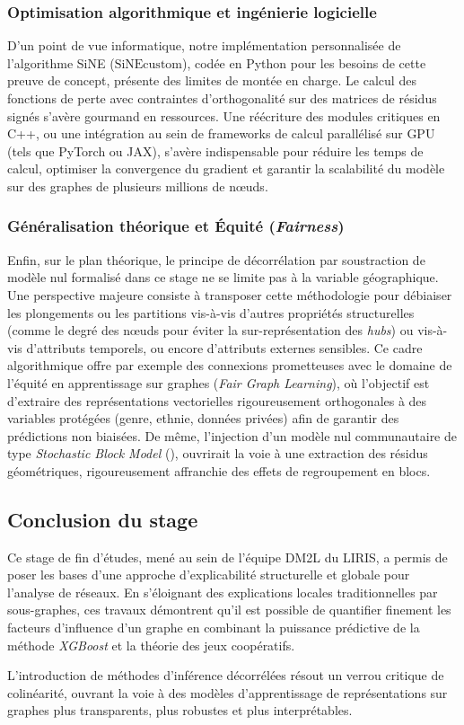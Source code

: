 \subsubsection{Optimisation algorithmique et ingénierie logicielle}
D'un point de vue informatique, notre implémentation personnalisée de l'algorithme SiNE ($\text{SiNEcustom}$), codée en Python pour les besoins de cette preuve de concept, présente des limites de montée en charge. Le calcul des fonctions de perte avec contraintes d'orthogonalité sur des matrices de résidus signés s'avère gourmand en ressources. 
Une réécriture des modules critiques en C++, ou une intégration au sein de frameworks de calcul parallélisé sur GPU (tels que PyTorch ou JAX), s'avère indispensable pour réduire les temps de calcul, optimiser la convergence du gradient et garantir la scalabilité du modèle sur des graphes de plusieurs millions de nœuds.

\subsubsection{Généralisation théorique et Équité (\textit{Fairness})}
Enfin, sur le plan théorique, le principe de décorrélation par soustraction de modèle nul formalisé dans ce stage ne se limite pas à la variable géographique. Une perspective majeure consiste à transposer cette méthodologie pour débiaiser les plongements ou les partitions vis-à-vis d'autres propriétés structurelles (comme le degré des nœuds pour éviter la sur-représentation des \textit{hubs}) ou vis-à-vis d'attributs temporels, ou encore d'attributs externes sensibles. Ce cadre algorithmique offre par exemple des connexions prometteuses avec le domaine de l'équité en apprentissage sur graphes (\textit{Fair Graph Learning}), où l'objectif est d'extraire des représentations vectorielles rigoureusement orthogonales à des variables protégées (genre, ethnie, données privées) afin de garantir des prédictions non biaisées. De même, l'injection d'un modèle nul communautaire de type \textit{Stochastic Block Model} (), ouvrirait la voie à une extraction des résidus géométriques, rigoureusement affranchie des effets de regroupement en blocs.


\subsection{Conclusion du stage}

Ce stage de fin d'études, mené au sein de l'équipe DM2L du LIRIS, a permis de poser les bases d'une approche d'explicabilité structurelle et globale pour l'analyse de réseaux. En s'éloignant des explications locales traditionnelles par sous-graphes, ces travaux démontrent qu'il est possible de quantifier finement les facteurs d'influence d'un graphe en combinant la puissance prédictive de la méthode \textit{XGBoost} et la théorie des jeux coopératifs. 

L'introduction de méthodes d'inférence décorrélées résout un verrou critique de colinéarité, ouvrant la voie à des modèles d'apprentissage de représentations sur graphes plus transparents, plus robustes et plus interprétables.